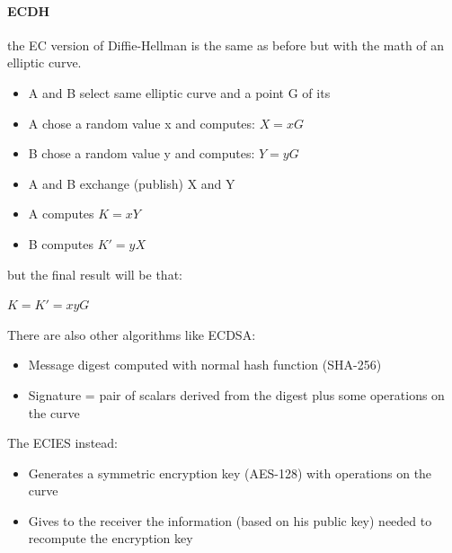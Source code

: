 \documentclass[12pt]{article}
\begin{document}
\paragraph{ECDH} the EC version of Diffie-Hellman is the same as before but with the math of an elliptic curve.\\
\begin{itemize}
  \item A and B select same elliptic curve and a point G of its
  \item A chose a random value x and computes: $X = x G$
  \item B chose a random value y and computes: $Y = y G$
  \item A and B exchange (publish) X and Y
  \item A computes $K = x Y$
  \item B computes $K' = y X$
\end{itemize}
but the final result will be that:
\begin{center}
  $K = K' = x y G$
\end{center}
There are also other algorithms like ECDSA:
\begin{itemize}
  \item Message digest computed with normal hash function (SHA-256)
  \item Signature = pair of scalars derived from the digest plus some operations on the curve
\end{itemize}
The ECIES instead:
\begin{itemize}
  \item Generates a symmetric encryption key (AES-128) with operations on the curve
  \item Gives to the receiver the information (based on his public key) needed to recompute the encryption key
\end{itemize}
\end{document}
